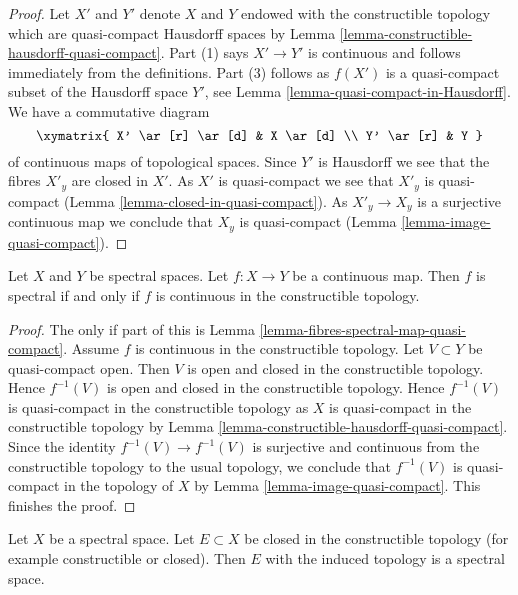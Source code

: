 \begin{proof}
Let $X'$ and $Y'$ denote $X$ and $Y$ endowed with the constructible topology
which are quasi-compact Hausdorff spaces by
Lemma \ref{lemma-constructible-hausdorff-quasi-compact}.
Part (1) says $X' \to Y'$ is continuous and follows immediately from the
definitions. Part (3) follows as $f(X')$ is a quasi-compact subset of the
Hausdorff space $Y'$, see Lemma \ref{lemma-quasi-compact-in-Hausdorff}.
We have a commutative diagram
$$
\xymatrix{
X' \ar[r] \ar[d] & X \ar[d] \\
Y' \ar[r] & Y
}
$$
of continuous maps of topological spaces. Since $Y'$ is Hausdorff
we see that the fibres $X'_y$ are closed in $X'$. As $X'$ is quasi-compact
we see that $X'_y$ is quasi-compact
(Lemma \ref{lemma-closed-in-quasi-compact}).
As $X'_y \to X_y$ is a surjective continuous map we conclude
that $X_y$ is quasi-compact (Lemma \ref{lemma-image-quasi-compact}).
\end{proof}

\begin{lemma}
\label{lemma-spectral-if-continuous-wrt-constructible-top}
Let $X$ and $Y$ be spectral spaces. Let $f : X \to Y$ be a continuous map.
Then $f$ is spectral if and only if $f$ is continuous in the constructible
topology.
\end{lemma}

\begin{proof}
The only if part of this is
Lemma \ref{lemma-fibres-spectral-map-quasi-compact}.
Assume $f$ is continuous in the constructible topology.
Let $V \subset Y$ be quasi-compact open.
Then $V$ is open and closed in the constructible topology.
Hence $f^{-1}(V)$ is open and closed in the constructible topology.
Hence $f^{-1}(V)$ is quasi-compact in the constructible topology
as $X$ is quasi-compact in the constructible topology by
Lemma \ref{lemma-constructible-hausdorff-quasi-compact}.
Since the identity $f^{-1}(V) \to f^{-1}(V)$ is surjective
and continuous from the constructible topology to the usual
topology, we conclude that $f^{-1}(V)$ is quasi-compact
in the topology of $X$ by Lemma \ref{lemma-image-quasi-compact}.
This finishes the proof.
\end{proof}

\begin{lemma}
\label{lemma-spectral-sub}
Let $X$ be a spectral space. Let $E \subset X$ be closed in the constructible
topology (for example constructible or closed). Then $E$ with the induced
topology is a spectral space.
\end{lemma}

